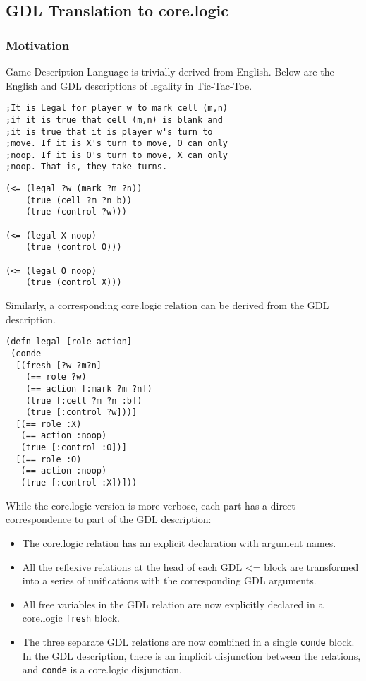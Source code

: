 \documentclass[letterpaper]{article}
\begin{document}
\subsection{GDL Translation to core.logic}
\subsubsection{Motivation}
Game Description Language is trivially derived from English. Below are the English and GDL descriptions of legality in Tic-Tac-Toe.
\begin{lstlisting}[frame=single, caption=The Legal relation for Tic-Tac-Toe expressed in English]
;It is Legal for player w to mark cell (m,n)
;if it is true that cell (m,n) is blank and
;it is true that it is player w's turn to
;move. If it is X's turn to move, O can only
;noop. If it is O's turn to move, X can only
;noop. That is, they take turns. 
\end{lstlisting}
\begin{lstlisting}[frame=single, caption=The Legal relation for Tic-Tac-Toe expressed in GDL]
(<= (legal ?w (mark ?m ?n))
    (true (cell ?m ?n b))
    (true (control ?w)))

(<= (legal X noop)
    (true (control O)))

(<= (legal O noop)
    (true (control X)))
\end{lstlisting}

Similarly, a corresponding core.logic relation can be derived from the GDL description.

\begin{lstlisting}[frame=single, caption=The Legal relation translated into core.logic]
(defn legal [role action]
 (conde
  [(fresh [?w ?m?n]
    (== role ?w)
    (== action [:mark ?m ?n])
    (true [:cell ?m ?n :b])
    (true [:control ?w]))]
  [(== role :X)
   (== action :noop)
   (true [:control :O])]
  [(== role :O)
   (== action :noop)
   (true [:control :X])]))
\end{lstlisting}

While the core.logic version is more verbose, each part has a direct correspondence to part of the GDL description:
\begin{itemize}
\item The core.logic relation has an explicit declaration with argument names.
\item All the reflexive relations at the head of each GDL \textless= block are transformed into a series of unifications with the corresponding GDL arguments. 
\item All free variables in the GDL relation are now explicitly declared in a core.logic \texttt{fresh} block.
\item The three separate GDL relations are now combined in a single \texttt{conde} block. In the GDL description, there is an implicit disjunction between the relations, and \texttt{conde} is a core.logic disjunction.
\end{itemize}
\end{document}
